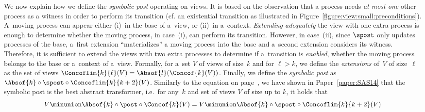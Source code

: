 We now explain how we define the \emph{symbolic post} operating on
views.
%
It is based on the observation that a process needs \emph{at most one}
other process as a witness in order to perform its transition %
%
(cf. an existential transition as illustrated in
Figure~\ref{figure:view:small:preconditions}).
%
A~moving process can appear either (i)~in the base of a~view, or
(ii)~in a~context.
%
%
\emph{Extending adequately} the view with one extra process is enough
to determine whether the moving process, in case~(i), can perform its
transition.
%
However, in case~(ii), since $\spost$ only updates processes of the
base, a~first extension %
``materializes'' a moving process into the base and a~second
extension %
considers its witness.
%
Therefore, it is sufficient to extend the views with two extra
processes to determine if a~transition is \emph{enabled}, whether the
moving process belongs to the base or a~context of a~view.
%
Formally, for a~set $V$ of views of size~$k$ and for $\ell>k$, we
define the \emph{extensions} of~$V$ of size~$\ell$ as the set of views
$\Concoflim{k}{\ell}(V)=\Absof{l}(\Concof{k}(V))$.
%
Finally, we define the \emph{symbolic post} as %
$\Absof{k}\circ\spost\circ\Concoflim{k}{k+2}(V)$.
%
Similarly to the equation on page~\pageref{view:abstraction:equation},
we have shown in Paper~\ref{paper:SAS14} that the symbolic post is the
best abstract transformer, i.e.\ for any~$k$ and set of views $V$ of
size up to $k$, it holds that %
$$V \minunion
\Absof{k}\circ\post\circ\Concof{k}(V) = V \minunion \Absof{k}\circ
\spost \circ \Concoflim{k}{k+2}(V) $$

